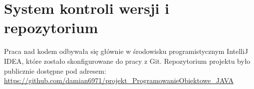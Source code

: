 \section{System kontroli wersji i repozytorium}
\label{sec:Systemkontroliwersji}
Praca nad kodem odbywała się głównie w środowisku programistycznym IntelliJ IDEA, które zostało skonfigurowane do pracy z Git. Repozytorium projektu było publicznie dostępne pod adresem: \\
\url{https://github.com/damian6971/projekt_ProgramowanieObiektowe_JAVA}